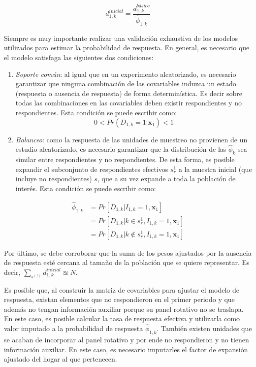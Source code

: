 \documentclass[
  10pt,
  spanish,
]{book}
\providecommand{\tightlist}{%
  \setlength{\itemsep}{0pt}\setlength{\parskip}{0pt}}
\begin{document}
\[
d_{1, k}^{inicial} = \frac{d_{1, k}^{básico}}{\hat{\phi}_{1, k}}
\]

Siempre es muy importante realizar una validación exhaustiva de los modelos utilizados para estimar la probabilidad de respuesta. En general, es necesario que el modelo satisfaga las siguientes dos condiciones:

\begin{enumerate}
\def\labelenumi{\arabic{enumi}.}
\tightlist
\item
  \emph{Soporte común}: al igual que en un experimento aleatorizado, es necesario garantizar que ninguna combinación de las covariables induzca un estado (respuesta o ausencia de respuesta) de forma determinística. Es decir sobre todas las combinaciones en las covariables deben existir respondientes y no respondientes. Esta condición se puede escribir como:
  \[
  0 < Pr(D_{1,k} = 1 |\mathbf{x}_{1}) < 1 
  \]
\item
  \emph{Balanceo}: como la respuesta de las unidades de muestreo no provienen de un estudio aleatorizado, es necesario garantizar que la distribución de las \(\hat\phi_k\) sea similar entre respondientes y no respondientes. De esta forma, es posible expandir el subconjunto de respondientes efectivos \(s_r^1\) a la muestra inicial (que incluye no respondientes) \(s\), que a su vez expande a toda la población de interés. Esta condición se puede escribir como:
\end{enumerate}

\begin{align*}
\hat\phi_{1, k} &= Pr[D_{1, k} | I_{1, k} = 1,\mathbf{x}_{1}] \\
&= Pr[D_{1, k} | k \in s_r^1, I_{1, k} = 1, \mathbf{x}_{1}] \\
&= Pr[D_{1, k} | k \notin s_r^1, I_{1, k} = 1, \mathbf{x}_{1}]
\end{align*}

Por último, se debe corroborar que la suma de los pesos ajustados por la ausencia de respuesta esté cercana al tamaño de la población que se quiere representar. Es decir, \(\sum_{s^{(1)}} d_{1, k}^{inicial} \approxeq N\).

Es posible que, al construir la matriz de covariables para ajustar el modelo de respuesta, existan elementos que no respondieron en el primer periodo y que además no tengan información auxiliar porque su panel rotativo no se traslapa. En este caso, es posible calcular la tasa de respuesta efectiva y utilizarla como valor imputado a la probabilidad de respuesta \(\hat\phi_{1, k}\). También existen unidades que se acaban de incorporar al panel rotativo y por ende no respondieron y no tienen información auxiliar. En este caso, es necesario imputarles el factor de expansión ajustado del hogar al que pertenecen.
\end{document}
